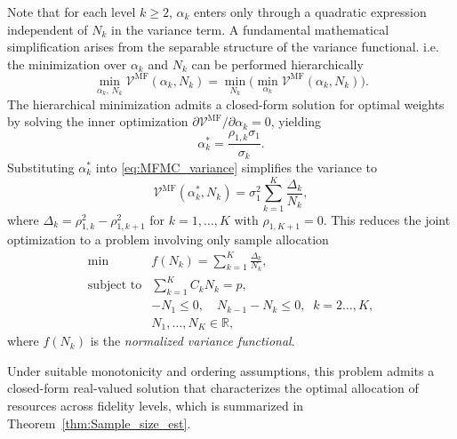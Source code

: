 Note that for each level $k\ge 2$, $\alpha_k$ enters only through a quadratic expression independent of $N_k$ in the variance term. A fundamental mathematical simplification arises from the separable structure of the variance functional.  i.e. the minimization over $\alpha_k$ and $N_k$ can be performed hierarchically
%
\begin{equation*}
    \min_{\alpha_k,\, N_k} \mathcal{V}^{\text{MF}}\left(\alpha_k, N_k\right)
    = \min_{N_k}\Big(\min_{\alpha_k} \mathcal{V}^{\text{MF}}(\alpha_k, N_k)\Big).
\end{equation*}
%
The hierarchical minimization admits a closed-form solution for optimal weights by solving the inner optimization $\partial \mathcal{V}^{\text{MF}}/\partial \alpha_k = 0$, yielding 
%
\begin{equation}\label{eq:MFMC_weights}
    \alpha_k^* = \frac{\rho_{1,k}\sigma_1}{\sigma_k}.
\end{equation}
%
Substituting $\alpha_k^*$ into \eqref{eq:MFMC_variance} simplifies the variance to 
%
\begin{equation*}
    \mathcal{V}^{\text{MF}}\left(\alpha_k^*, N_k\right)
    = \sigma_1^2\sum_{k=1}^K \frac{\Delta_k}{N_k},
\end{equation*}
%
where $\Delta_k = \rho_{1,k}^2 - \rho_{1,k+1}^2$ for $k = 1, \dots, K$ with $\rho_{1,K+1}=0$. This reduces the joint optimization to a problem involving only sample allocation
%
\begin{equation}\label{eq:Optimization_pb_sample_size_reduced}
    \begin{array}{ll}
    \min &\displaystyle f(N_k) =\sum_{k=1}^K \frac{\Delta_k}{N_k},\\
       \text{subject to} &\displaystyle\sum\limits_{k=1}^K C_kN_k=p,\\[2pt]
       &\displaystyle -N_1\le 0,\quad \displaystyle N_{k-1}-N_k\le 0, \;\; k=2\ldots,K,\\
       &N_1,\ldots, N_K\in \mathbb{R},
    \end{array}
\end{equation}
%
where $f(N_k)$ is the {\it normalized variance functional}.

Under suitable monotonicity and ordering assumptions, this problem admits a closed-form real-valued solution that characterizes the optimal allocation of resources across fidelity levels, which is summarized in Theorem~\ref{thm:Sample_size_est}.


